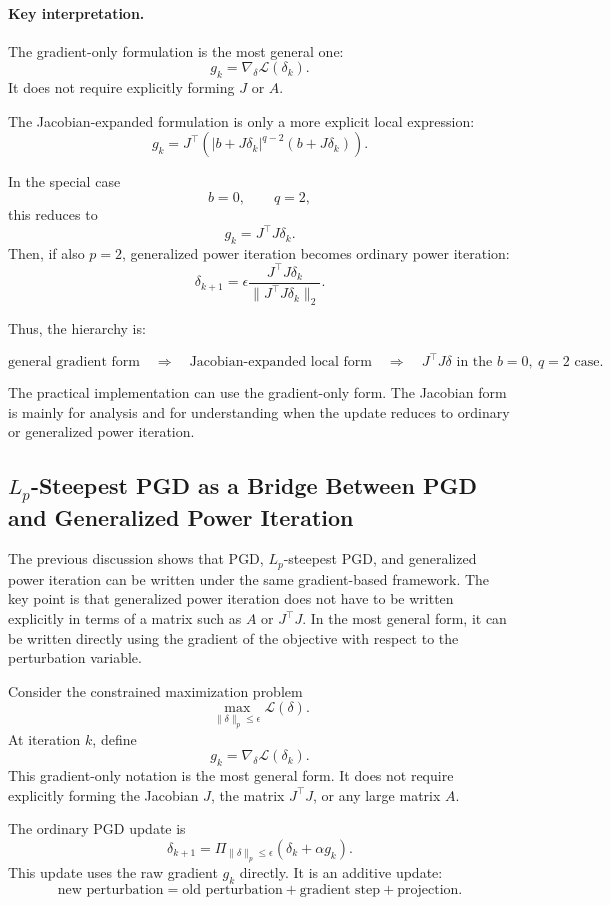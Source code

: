 \documentclass{article}
\begin{document}
\paragraph{Key interpretation.}
The gradient-only formulation is the most general one:
\[
g_k=\nabla_\delta \mathcal L(\delta_k).
\]
It does not require explicitly forming $J$ or $A$.

The Jacobian-expanded formulation is only a more explicit local expression:
\[
g_k=
J^\top
\left(
|b+J\delta_k|^{q-2}
(b+J\delta_k)
\right).
\]

In the special case
\[
b=0,
\qquad
q=2,
\]
this reduces to
\[
g_k=J^\top J\delta_k.
\]
Then, if also $p=2$, generalized power iteration becomes ordinary power iteration:
\[
\delta_{k+1}
=
\epsilon
\frac{J^\top J\delta_k}
{\|J^\top J\delta_k\|_2}.
\]

Thus, the hierarchy is:

\[
\text{general gradient form}
\quad
\Longrightarrow
\quad
\text{Jacobian-expanded local form}
\quad
\Longrightarrow
\quad
J^\top J\delta
\text{ in the } b=0,\ q=2 \text{ case}.
\]

The practical implementation can use the gradient-only form. The Jacobian form is mainly for analysis and for understanding when the update reduces to ordinary or generalized power iteration.

\subsection{$L_p$-Steepest PGD as a Bridge Between PGD and Generalized Power Iteration}

The previous discussion shows that PGD, $L_p$-steepest PGD, and generalized power iteration can be written under the same gradient-based framework. The key point is that generalized power iteration does not have to be written explicitly in terms of a matrix such as $A$ or $J^\top J$. In the most general form, it can be written directly using the gradient of the objective with respect to the perturbation variable.

Consider the constrained maximization problem
\[
\max_{\|\delta\|_p\le \epsilon}\mathcal L(\delta).
\]
At iteration $k$, define
\[
g_k=\nabla_\delta \mathcal L(\delta_k).
\]
This gradient-only notation is the most general form. It does not require explicitly forming the Jacobian $J$, the matrix $J^\top J$, or any large matrix $A$.

The ordinary PGD update is
\[
\delta_{k+1}
=
\Pi_{\|\delta\|_p\le\epsilon}
\left(
\delta_k+\alpha g_k
\right).
\]
This update uses the raw gradient $g_k$ directly. It is an additive update:
\[
\text{new perturbation}
=
\text{old perturbation}
+
\text{gradient step}
+
\text{projection}.
\]
\end{document}
